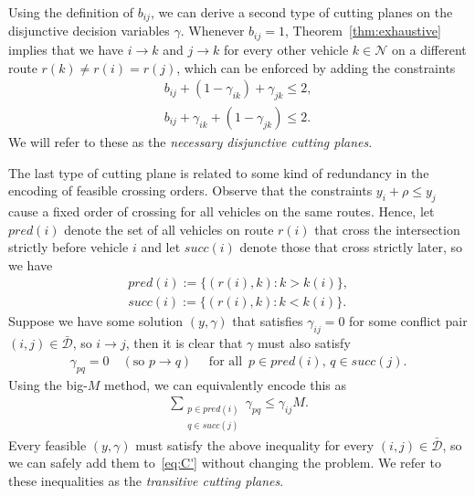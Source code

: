 \documentclass[a4paper]{report}
\theoremstyle{definition}
\theoremstyle{plain}
\begin{document}
Using the definition of $b_{ij}$, we can derive a second type of cutting planes
on the disjunctive decision variables $\gamma$. Whenever $b_{ij} = 1$, Theorem~\ref{thm:exhaustive}
implies that we have $i \rightarrow k$ and $j \rightarrow k$ for every other vehicle
$k \in \mathcal{N}$ on a different route $r(k) \neq r(i) = r(j)$, which can be
enforced by adding the constraints
\begin{subequations}
\begin{align}
  b_{ij} + (1 - \gamma_{ik}) + \gamma_{jk} \leq 2 , \tag{disj.cut.1} \\
  b_{ij} + \gamma_{ik} + (1 - \gamma_{jk}) \leq 2 . \tag{disj.cut.2}
\end{align}
\end{subequations}
We will refer to these as the \textit{necessary disjunctive cutting planes}.

The last type of cutting plane is related to some kind of redundancy in the
encoding of feasible crossing orders.
%
Observe that the constraints $y_i + \rho \leq y_j$ cause a fixed order of
crossing for all vehicles on the same routes. Hence, let $\mathit{pred}(i)$
denote the set of all vehicles on route $r(i)$ that cross the intersection
strictly before vehicle $i$ and let $\mathit{succ}(i)$ denote those that cross
strictly later, so we have
\begin{align*}
  \mathit{pred}(i) := \{ (r(i), k) : k > k(i) \} , \\
  \mathit{succ}(i) := \{ (r(i), k) : k < k(i) \} .
\end{align*}
%
Suppose we have some solution $(y,\gamma)$ that satisfies $\gamma_{ij} = 0$ for
some conflict pair $(i,j) \in \bar{\mathcal{D}}$, so $i \rightarrow j$, then it is
clear that $\gamma$ must also satisfy
\begin{align*}
  \gamma_{pq} = 0 \quad (\text{so } p \rightarrow q) \quad \text{ for all } \, p \in \mathit{pred}(i), \, q \in \mathit{succ}(j) .
\end{align*}
Using the big-$M$ method, we can equivalently encode this as
\begin{align}
  \sum_{\substack{p \in \mathit{pred}(i)\\ q \in \mathit{succ}(j)}} \gamma_{pq} \leq \gamma_{ij} M . \tag{trans.cut}
\end{align}
Every feasible $(y,\gamma)$ must satisfy the above inequality for every
$(i,j) \in \bar{\mathcal{D}}$, so we can safely add them to~\eqref{eq:C'}
without changing the problem. We refer to these inequalities as the
\emph{transitive cutting planes}.
\end{document}

